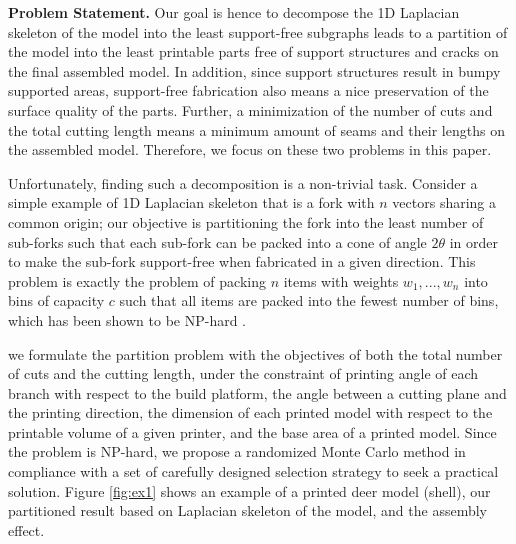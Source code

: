\textbf{Problem Statement.} Our goal is hence to decompose the 1D Laplacian skeleton of the model into the least support-free subgraphs leads to a partition of the model into the least printable parts free of support structures and cracks on the final assembled model. In addition, since support structures result in bumpy supported areas, support-free fabrication also means a nice preservation of the surface quality of the parts. Further, a minimization of the number of cuts and the total cutting length means a minimum amount of seams and their lengths on the assembled model. Therefore, we focus on these two problems in this paper.

Unfortunately, finding such a decomposition is a non-trivial task. Consider a simple example of 1D Laplacian skeleton that is a fork with $n$ vectors sharing a common origin; our objective is partitioning the fork into the least number of sub-forks such that each sub-fork can be packed into a cone of angle $2\theta$ in order to make the sub-fork support-free when fabricated in a given direction. This problem is exactly the problem of packing $n$ items with weights $w_1, ..., w_n$ into bins of capacity $c$ such that all items are packed into the fewest number of bins, which has been shown to be NP-hard \cite{Fukunaga:2007}.

we formulate the partition problem with the objectives of both the total number of cuts and the cutting length, under the constraint of printing angle of each branch with respect to the build platform, the angle between a cutting plane and the printing direction, the dimension of each printed model with respect to the printable volume of a given printer, and the base area of a printed model. Since the problem is NP-hard, we propose a randomized Monte Carlo method in compliance with a set of carefully designed selection strategy to seek a practical solution. Figure \ref{fig:ex1} shows an example of a printed deer model (shell), our partitioned result based on Laplacian skeleton of the model, and the assembly effect.


